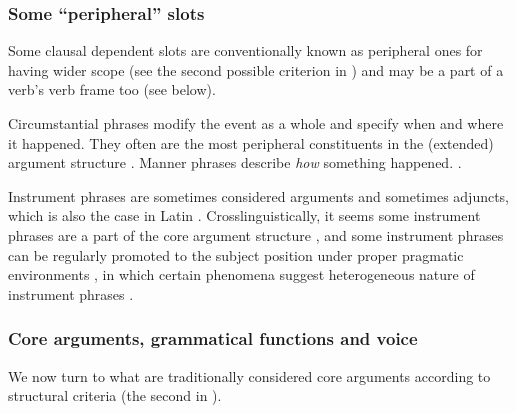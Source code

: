 \documentclass[a4paper, oneside, 12pt]{report}
\newcommand*{\citepage}[1]{p.~{#1}}
\newcommand*{\citepages}[1]{pp.~{#1}}
\begin{document}
\subsubsection{Some ``peripheral'' slots}

Some clausal dependent slots are conventionally known as peripheral ones for having wider scope 
(see the second possible criterion in )
and may be a part of a verb's verb frame too (see below).

Circumstantial phrases modify the event as a whole and specify when and where it happened.
They often are the most peripheral constituents in the (extended) argument structure
\citep[\citepage{29}]{cinque1999adverbs}.
Manner phrases describe \emph{how} something happened.
\citep[\citepage{71-75}, \citepages{101-109}]{devine2006latin}.

Instrument phrases are sometimes considered arguments and sometimes adjuncts,
which is also the case in Latin \citep[\citepages{57-58}, \citepage{65-67}]{devine2006latin}.
Crosslinguistically, it seems some instrument phrases are a part of the core argument structure
\citep{pascual2001syntactic},
and some instrument phrases can be regularly promoted to the subject position
under proper pragmatic environments \citep{alexiadou2008instrument},
in which certain phenomena suggest heterogeneous nature of instrument phrases \citep{wilson2020reversible}.

\subsubsection{Core arguments, grammatical functions and voice}\label{sec:grammatical.clause.core}

We now turn to what are traditionally considered core arguments according to structural criteria
(the second in ).
\end{document}
